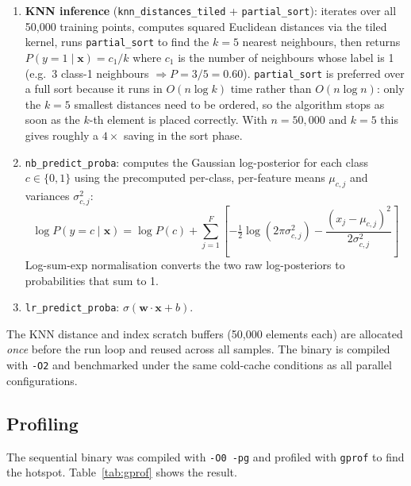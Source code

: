 \documentclass[12pt,a4paper]{article}
\begin{document}
\begin{enumerate}
  \item \textbf{KNN inference} (\texttt{knn\_distances\_tiled} + \texttt{partial\_sort}):
        iterates over all 50{,}000 training
        points, computes squared Euclidean distances via the tiled kernel, runs
        \texttt{partial\_sort} to find the $k=5$ nearest neighbours, then
        returns $P(y{=}1 \mid \mathbf{x}) = c_1 / k$ where $c_1$ is the
        number of neighbours whose label is 1 (e.g.\ 3 class-1 neighbours
        $\Rightarrow P = 3/5 = 0.60$).
        \texttt{partial\_sort} is preferred over a full sort because it runs
        in $O(n \log k)$ time rather than $O(n \log n)$: only the $k=5$
        smallest distances need to be ordered, so the algorithm stops as
        soon as the $k$-th element is placed correctly. With $n = 50{,}000$
        and $k = 5$ this gives roughly a $4\times$ saving in the sort phase.
  \item \texttt{nb\_predict\_proba}: computes the Gaussian log-posterior
        for each class $c \in \{0,1\}$ using the precomputed per-class,
        per-feature means $\mu_{c,j}$ and variances $\sigma^2_{c,j}$:
        \[
          \log P(y{=}c \mid \mathbf{x}) = \log P(c)
            + \sum_{j=1}^{F}
              \left[
                -\tfrac{1}{2}\log(2\pi\sigma^2_{c,j})
                - \frac{(x_j - \mu_{c,j})^2}{2\sigma^2_{c,j}}
              \right]
        \]
        Log-sum-exp normalisation converts the two raw log-posteriors to
        probabilities that sum to 1.
  \item \texttt{lr\_predict\_proba}: $\sigma(\mathbf{w} \cdot \mathbf{x} + b)$.
\end{enumerate}

The KNN distance and index scratch buffers (50{,}000 elements each) are
allocated \emph{once} before the run loop and reused across all samples.
The binary is compiled with \texttt{-O2} and benchmarked under the same
cold-cache conditions as all parallel configurations.

\subsection{Profiling}
\label{sec:profiling}

The sequential binary was compiled with \texttt{-O0 -pg} and profiled with
\texttt{gprof} to find the hotspot. Table~\ref{tab:gprof} shows the result.
\end{document}
